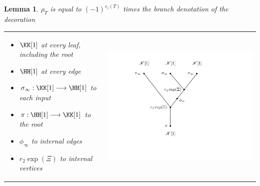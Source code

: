 \documentclass[english,letter paper,12pt,leqno]{article}
\newtheorem{lemma}[theorem]{Lemma}
\theoremstyle{example}
\numberwithin{equation}{section}
\begin{document}
\begin{lemma} $\rho_T$ is equal to $(-1)^{e_i(T)}$ times the branch denotation of the decoration
\begin{center}
\begin{tabular}{ >{\centering}m{8cm} >{\centering}m{8cm}}
\begin{itemize}
\item $\KK[1]$ at every leaf, including the root
\item $\HH[1]$ at every edge
\item $\sigma_\infty: \KK[1] \lto \HH[1]$ to each input
\item $\pi: \HH[1] \lto \KK[1]$ to the root
\item $\phi_\infty$ to internal edges
\item $r_2 \exp(\Xi)$ to internal vertices
\end{itemize}
&
\includegraphics[scale=0.35]{dia12}
\end{tabular}
\end{center}
\end{lemma}
\end{document}
